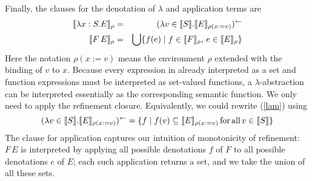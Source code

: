 \documentclass{llncs}
\begin{document}

Finally, the clauses for the denotation of $\lambda$ and application terms are
\begin{eqnarray}
\label{lam}                                            
 \llbracket\lambda x:S.E\rrbracket_{\rho} &=& (\lambda v\in\llbracket S\rrbracket . \llbracket E\rrbracket_{\rho(x := v)})^\leftarrow
\\
\label{app}
 \llbracket F\, E\rrbracket_{\rho} &=& \bigcup \{f(e) \mid  f \in \llbracket F\rrbracket_{\rho},\, e \in \llbracket E\rrbracket_{\rho}\}
\end{eqnarray}
Here the notation $\rho(x := v)$ means the environment $\rho$ extended with the
binding of $v$ to $x$.
Because every expression in already interpreted as a set and function expressions must be interpreted as set-valued functions, a $\lambda$-abstraction can be interpreted essentially as the corresponding semantic function.
We only need to apply the refinement closure.
Equivalently, we could rewrite (\ref{lam}) using
\[(\lambda v\in\llbracket S\rrbracket . \llbracket E\rrbracket_{\rho(x := v)})^\leftarrow  =  \{f \mid  f(v) \subseteq \llbracket E\rrbracket_{\rho(x := v)} \mathrm{\,for\,all\,}v\in\llbracket S\rrbracket\}\]
The clause for application captures our intuition of monotonicity of refinement: $F\,E$ is interpreted by applying all possible denotations $f$ of $F$ to all possible denotations $e$ of $E$; each such application returns a set, and we take the union of all these sets.
\end{document}
